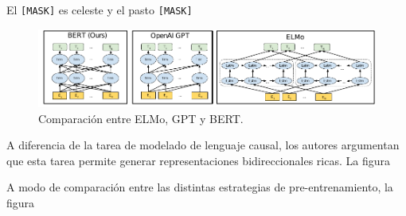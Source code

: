 \begin{center}
    El \verb|[MASK]| es celeste y el pasto \verb|[MASK]|
\end{center}


\begin{figure}
    \centering
    \includegraphics[width=\textwidth]{img/02/gpt_vs_bert.pdf}
    \caption{Comparación entre ELMo, GPT y BERT. }
\end{figure}

A diferencia de la tarea de modelado de lenguaje causal, los autores argumentan que esta tarea permite generar representaciones bidireccionales ricas. La figura


A modo de comparación entre las distintas estrategias de pre-entrenamiento, la figura



